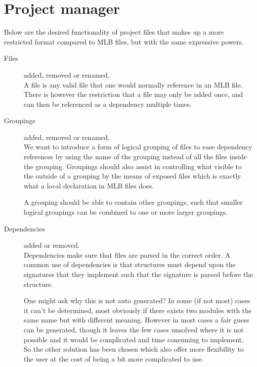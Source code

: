 
\section{Project manager}
\label{sec:appendix-project-manager}

Below are the desired functionality of project files that makes up a more
restricted format compared to MLB files, but with the same expressive powers.

\begin{description}
\item[Files] added, removed or renamed. \\

  A file is any valid file that one would normally reference in an MLB file.
  There is however the restriction that a file may only be added once, and can
  then be referenced as a dependency multiple times.
  
\item[Groupings] added, removed or renamed. \\

  We want to introduce a form of logical grouping of files to ease dependency
  references by using the name of the grouping instead of all the files inside
  the grouping. Groupings should also assist in controlling what visible to the
  outside of a grouping by the means of exposed files which is exactly what a
  local declaration in MLB files does.

  A grouping should be able to contain other groupings, such that smaller
  logical groupings can be combined to one or more larger groupings. 

\item[Dependencies] added or removed. \\

  Dependencies make sure that files are parsed in the correct order. A common
  use of dependencies is that structures must depend upon the signatures that
  they implement such that the signature is parsed before the structure.

  One might ask why this is not auto generated? In some (if not most) cases it
  can't be determined, most obviously if there exists two modules with the same
  name but with different meaning. However in most cases a fair guess can be
  generated, though it leaves the few cases unsolved where it is not possible
  and it would be complicated and time consuming to implement. So the other
  solution has been chosen which also offer more flexibility to the user at the
  cost of being a bit more complicated to use.


\end{description}

